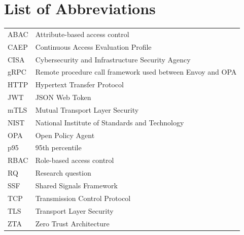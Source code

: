 \chapter*{List of Abbreviations}
\begin{tabular}{@{}ll@{}}
ABAC & Attribute-based access control\\
CAEP & Continuous Access Evaluation Profile\\
CISA & Cybersecurity and Infrastructure Security Agency\\
gRPC & Remote procedure call framework used between Envoy and OPA\\
HTTP & Hypertext Transfer Protocol\\
JWT & JSON Web Token\\
mTLS & Mutual Transport Layer Security\\
NIST & National Institute of Standards and Technology\\
OPA & Open Policy Agent\\
p95 & 95th percentile\\
RBAC & Role-based access control\\
RQ & Research question\\
SSF & Shared Signals Framework\\
TCP & Transmission Control Protocol\\
TLS & Transport Layer Security\\
ZTA & Zero Trust Architecture\\
\end{tabular}
